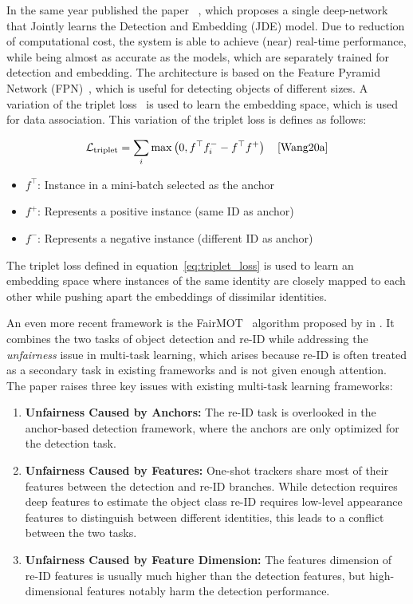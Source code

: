 In the same year \citeauthor{Wang20a} published the paper ~\cite{Wang20a}, which proposes a single deep-network that Jointly learns the Detection and Embedding (JDE) model. Due to reduction of computational cost, the system is able to achieve (near) real-time performance, while being almost as accurate as the models, which are separately trained for detection and embedding. The architecture is based on the Feature Pyramid Network (FPN)~\cite{Lin17}, which is useful for detecting objects of different sizes. A variation of the triplet loss~\cite{Schroff15} is used to learn the embedding space, which is used for data association. This variation of the triplet loss is defines as follows:

\begin{equation}
    \label{eq:triplet_loss}
    \mathcal{L}_{\text{triplet}}=\sum_i \max \left(0, f^{\top} f_i^{-}-f^{\top} f^{+}\right)
    \quad\text{\cite[Eq.~1]{Wang20a}}
\end{equation}

\begin{itemize}
    \item \(f^{\top}\): Instance in a mini-batch selected as the anchor
    \item \(f^{+}\): Represents a positive instance (same ID as anchor)
    \item \(f^{-}\): Represents a negative instance (different ID as anchor)
\end{itemize}

The triplet loss defined in equation~\ref{eq:triplet_loss} is used to learn an embedding space where instances of the same identity are closely mapped to each other while pushing apart the embeddings of dissimilar identities.

An even more recent framework is the FairMOT~\cite{Zhang21} algorithm proposed by \citeauthor{Zhang21} in \citeyear{Zhang21}. It combines the two tasks of object detection and re-ID while addressing the \textit{unfairness} issue in multi-task learning, which arises because re-ID is often treated as a secondary task in existing frameworks and is not given enough attention. The paper raises three key issues with existing multi-task learning frameworks:

\begin{enumerate}
    \item \textbf{Unfairness Caused by Anchors:} The re-ID task is overlooked in the anchor-based detection framework, where the anchors are only optimized for the detection task.
    \item \textbf{Unfairness Caused by Features:} One-shot trackers share most of their features between the detection and re-ID branches. While detection requires deep features to estimate the object class re-ID requires low-level appearance features to distinguish between different identities, this leads to a conflict between the two tasks.
    \item \textbf{Unfairness Caused by Feature Dimension:} The features dimension of re-ID features is usually much higher than the detection features, but high-dimensional features notably harm the detection performance.
\end{enumerate}

